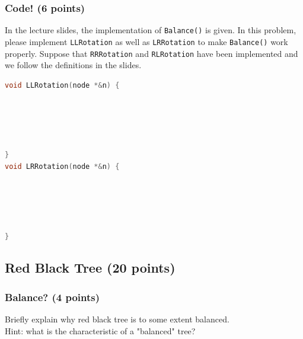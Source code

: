 \documentclass[11pt]{exam}
\begin{document}
\subsubsection{Code! (6 points)}
In the lecture slides, the implementation of \lstinline{Balance()} is given. In this problem, please implement \lstinline{LLRotation} as well as \lstinline{LRRotation} to make \lstinline{Balance()} work properly. Suppose that \lstinline{RRRotation} and \lstinline{RLRotation} have been implemented and we follow the definitions in the slides.
\begin{lstlisting}[language=c++]
void LLRotation(node *&n) {
    
    
    
    
    
}
void LRRotation(node *&n) {
    
    
    
    
    
}
\end{lstlisting}

\subsection{Red Black Tree (20 points)}
\subsubsection{Balance? (4 points)}
Briefly explain why red black tree is to some extent balanced.\\
Hint: what is the characteristic of a "balanced" tree?
\begin{solution}
\end{solution}
\end{document}
